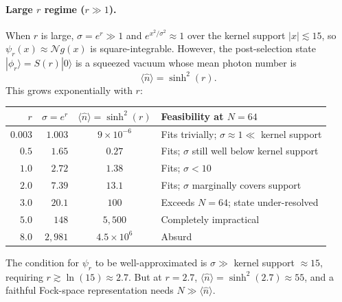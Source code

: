\documentclass[11pt]{article}
\begin{document}
\paragraph{Large $r$ regime ($r \gg 1$).}
When $r$ is large, $\sigma = e^r \gg 1$ and $e^{x^2/\sigma^2} \approx 1$ over
the kernel support $|x| \lesssim 15$, so $\psi_r(x) \approx \mathcal{N}g(x)$
is square-integrable.  However, the post-selection state $|\phi_r\rangle = S(r)|0\rangle$
is a squeezed vacuum whose mean photon number is
\begin{equation}\label{eq:nbar}
  \langle\hat{n}\rangle = \sinh^2(r).
\end{equation}
This grows exponentially with $r$:

\begin{center}
\begin{tabular}{rrcl}
  \toprule
  $r$ & $\sigma = e^r$ & $\langle\hat{n}\rangle = \sinh^2(r)$ & Feasibility at $N = 64$ \\
  \midrule
  $0.003$ & $1.003$ & $9\times10^{-6}$ & Fits trivially; $\sigma \approx 1 \ll$ kernel support \\
  $0.5$ & $1.65$ & $0.27$ & Fits; $\sigma$ still well below kernel support \\
  $1.0$ & $2.72$ & $1.38$ & Fits; $\sigma < 10$ \\
  $2.0$ & $7.39$ & $13.1$ & Fits; $\sigma$ marginally covers support \\
  $3.0$ & $20.1$ & $100$ & Exceeds $N = 64$; state under-resolved \\
  $5.0$ & $148$ & $5{,}500$ & Completely impractical \\
  $8.0$ & $2{,}981$ & $4.5\times10^6$ & Absurd \\
  \bottomrule
\end{tabular}
\end{center}

The condition for $\psi_r$ to be well-approximated is
$\sigma \gg$ kernel support $\approx 15$, requiring $r \gtrsim \ln(15) \approx 2.7$.
But at $r = 2.7$, $\langle\hat{n}\rangle = \sinh^2(2.7) \approx 55$, and a faithful
Fock-space representation needs $N \gg \langle\hat{n}\rangle$.
\end{document}
